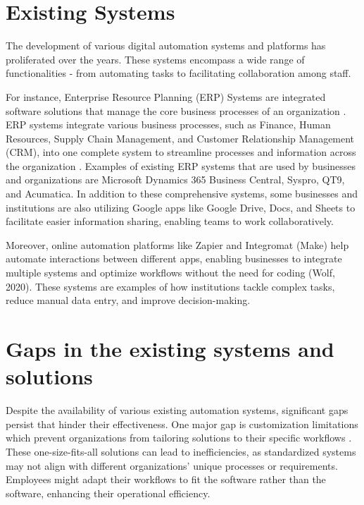 \section{Existing Systems}

The development of various digital automation systems and platforms has proliferated over the years. These systems encompass a wide range of functionalities - from automating tasks to facilitating collaboration among staff.

For instance, Enterprise Resource Planning (ERP) Systems are integrated software solutions that manage the core business processes of an organization \cite{blahusiakova2023}. ERP systems integrate various business processes, such as Finance, Human Resources, Supply Chain Management, and Customer Relationship Management (CRM), into one complete system to streamline processes and information across the organization \cite{kimberling2024}. Examples of existing ERP systems that are used by businesses and organizations are Microsoft Dynamics 365 Business Central, Syspro, QT9, and Acumatica. In addition to these comprehensive systems, some businesses and institutions are also utilizing Google apps like Google Drive, Docs, and Sheets to facilitate easier information sharing, enabling teams to work collaboratively. 
 
Moreover, online automation platforms like Zapier and Integromat (Make) help automate interactions between different apps, enabling businesses to integrate multiple systems and optimize workflows without the need for coding (Wolf, 2020). These systems are examples of how institutions tackle complex tasks, reduce manual data entry, and improve decision-making.

\section{Gaps in the  existing systems and solutions}

Despite the availability of various existing automation systems, significant gaps persist that hinder their effectiveness. One major gap is customization limitations which prevent organizations from tailoring solutions to their specific workflows \cite{aleixo2010}. These one-size-fits-all solutions can lead to inefficiencies, as standardized systems may not align with different organizations' unique processes or requirements. Employees might adapt their workflows to fit the software rather than the software, enhancing their operational efficiency. 

